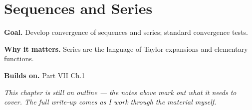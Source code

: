 \chapter{Sequences and Series}
\label{ch:07-real-analysis-and-measure-theory-02}

\begin{chapterintro}
\textbf{Goal.} Develop convergence of sequences and series; standard convergence tests.

\textbf{Why it matters.} Series are the language of Taylor expansions and elementary functions.

\textbf{Builds on.} Part VII Ch.1
\end{chapterintro}

\textit{This chapter is still an outline --- the notes above mark out what it needs to cover. The full write-up comes as I work through the material myself.}
